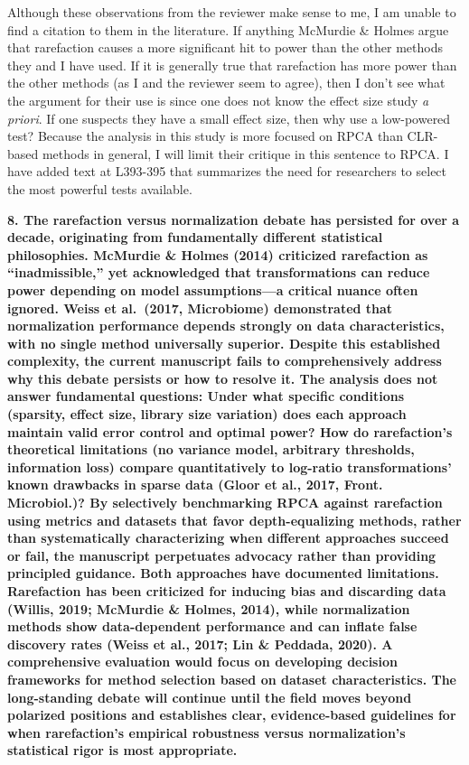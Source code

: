 \documentclass[
  11pt,
]{article}
\begin{document}
Although these observations from the reviewer make sense to me, I am
unable to find a citation to them in the literature. If anything
McMurdie \& Holmes argue that rarefaction causes a more significant hit
to power than the other methods they and I have used. If it is generally
true that rarefaction has more power than the other methods (as I and
the reviewer seem to agree), then I don't see what the argument for
their use is since one does not know the effect size study \emph{a
priori}. If one suspects they have a small effect size, then why use a
low-powered test? Because the analysis in this study is more focused on
RPCA than CLR-based methods in general, I will limit their critique in
this sentence to RPCA. I have added text at L393-395 that summarizes the
need for researchers to select the most powerful tests available.

\textbf{8. The rarefaction versus normalization debate has persisted for
over a decade, originating from fundamentally different statistical
philosophies. McMurdie \& Holmes (2014) criticized rarefaction as
``inadmissible,'' yet acknowledged that transformations can reduce power
depending on model assumptions---a critical nuance often ignored. Weiss
et al.~(2017, Microbiome) demonstrated that normalization performance
depends strongly on data characteristics, with no single method
universally superior. Despite this established complexity, the current
manuscript fails to comprehensively address why this debate persists or
how to resolve it. The analysis does not answer fundamental questions:
Under what specific conditions (sparsity, effect size, library size
variation) does each approach maintain valid error control and optimal
power? How do rarefaction's theoretical limitations (no variance model,
arbitrary thresholds, information loss) compare quantitatively to
log-ratio transformations' known drawbacks in sparse data (Gloor et al.,
2017, Front. Microbiol.)? By selectively benchmarking RPCA against
rarefaction using metrics and datasets that favor depth-equalizing
methods, rather than systematically characterizing when different
approaches succeed or fail, the manuscript perpetuates advocacy rather
than providing principled guidance. Both approaches have documented
limitations. Rarefaction has been criticized for inducing bias and
discarding data (Willis, 2019; McMurdie \& Holmes, 2014), while
normalization methods show data-dependent performance and can inflate
false discovery rates (Weiss et al., 2017; Lin \& Peddada, 2020). A
comprehensive evaluation would focus on developing decision frameworks
for method selection based on dataset characteristics. The long-standing
debate will continue until the field moves beyond polarized positions
and establishes clear, evidence-based guidelines for when rarefaction's
empirical robustness versus normalization's statistical rigor is most
appropriate.}
\end{document}
